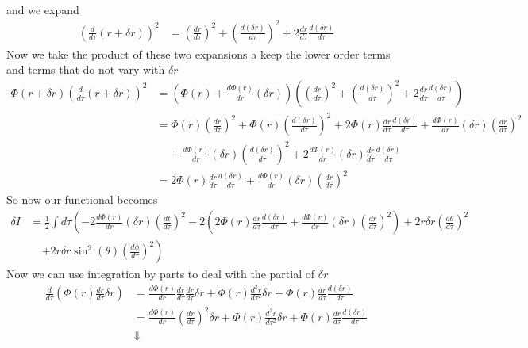 \documentclass[11pt]{article}
\numberwithin{equation}{section}
\begin{document}
\begin{enumerate}[(a)]
\begin{align*}
\end{align*}
and we expand 
\begin{align*}
\left(\frac{d}{d\tau}(r+\delta r)\right)^2 &= \left(\frac{dr}{d\tau}\right)^2 + \left(\frac{d(\delta r)}{d\tau}\right)^2 + 2\frac{dr}{d\tau}\frac{d(\delta r)}{d\tau}
\end{align*}
Now we take the product of these two expansions a keep the lower order terms and terms that do not vary with $\delta r$
\begin{align*}
\Phi(r+\delta r)\left(\frac{d}{d\tau}(r+\delta r)\right)^2  &= \left(\Phi(r) + \frac{d\Phi(r)}{dr}(\delta r)\right)\left(\left(\frac{dr}{d\tau}\right)^2 + \left(\frac{d(\delta r)}{d\tau}\right)^2 + 2\frac{dr}{d\tau}\frac{d(\delta r)}{d\tau}\right)\\
&= \Phi(r)\left(\frac{dr}{d\tau}\right)^2 + \Phi(r)\left(\frac{d(\delta r)}{d\tau}\right)^2 + 2\Phi(r)\frac{dr}{d\tau}\frac{d(\delta r)}{d\tau} + \frac{d\Phi(r)}{dr}(\delta r)\left(\frac{dr}{d\tau}\right)^2 \\
& \ \ \ \ \ + \frac{d\Phi(r)}{dr}(\delta r)\left(\frac{d(\delta r)}{d\tau}\right)^2 + 2\frac{d\Phi(r)}{dr}(\delta r)\frac{dr}{d\tau}\frac{d(\delta r)}{d\tau}\\
&= 2\Phi(r)\frac{dr}{d\tau}\frac{d(\delta r)}{d\tau} + \frac{d\Phi(r)}{dr}(\delta r)\left(\frac{dr}{d\tau}\right)^2
\end{align*}
So now our functional becomes 
\begin{align*}
\delta I &= \frac{1}{2}\int d\tau\left(-2\frac{d\Phi(r)}{dr}(\delta r)\left(\frac{dt}{d\tau}\right)^2 - 2\left(2\Phi(r)\frac{dr}{d\tau}\frac{d(\delta r)}{d\tau} + \frac{d\Phi(r)}{dr}(\delta r)\left(\frac{dr}{d\tau}\right)^2\right) + 2r\delta r\left(\frac{d\theta}{d\tau}\right)^2 \right.\\
&\ \ \ \ \ \left.+ 2r\delta r\sin^2(\theta)\left(\frac{d\phi}{d\tau}\right)^2\right)
\end{align*}
Now we can use integration by parts to deal with the partial of $\delta r$ 
\begin{align*}
\frac{d}{d\tau}\left(\Phi(r)\frac{dr}{d\tau}\delta r\right) &= \frac{d\Phi(r)}{dr}\frac{dr}{d\tau}\frac{dr}{d\tau}\delta r + \Phi(r)\frac{d^2r}{d\tau^2}\delta r + \Phi(r)\frac{dr}{d\tau}\frac{d(\delta r)}{d\tau}\\
&= \frac{d\Phi(r)}{dr}\left(\frac{dr}{d\tau}\right)^2\delta r + \Phi(r)\frac{d^2r}{d\tau^2}\delta r + \Phi(r)\frac{dr}{d\tau}\frac{d(\delta r)}{d\tau}\\
&\Downarrow\\

\end{align*}
\end{enumerate}
\end{document}

